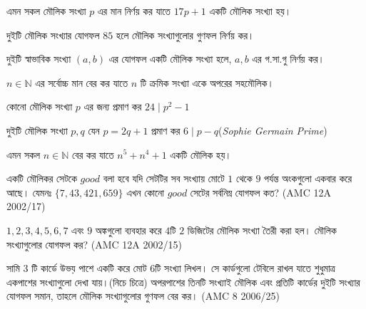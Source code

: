 \documentclass[a4paper,11pt]{article}
\begin{document}
\begin{Exercise}
	\label{xr-3}
	\begin{prob}
		এমন সকল মৌলিক সংখ্যা $p$ এর মান নির্ণয় কর যাতে $17p+1$ একটি মৌলিক সংখ্যা হয়। 
	\end{prob}
	\begin{prob}
		\label{sump}
		দুইটি মৌলিক সংখ্যার যোগফল $85$ হলে মৌলিক সংখ্যাগুলোর গুণফল নির্ণয় কর। 
	\end{prob}
	\begin{prob}
		দুইটি স্বাভাবিক সংখ্যা $(a,b)$ এর যোগফল একটি মৌলিক সংখ্যা হলে, $a,b$ এর গ.সা.গু নির্ণয় কর। 
	\end{prob}
	\begin{prob}
		$n \in \mathbb{N}$ এর সর্বোচ্চ মান বের কর যাতে $n$ টি ক্রমিক সংখ্যা একে অপরের সহমৌলিক। 
	\end{prob}
	\begin{prob}
		\label{Prime6}
		কোনো মৌলিক সংখ্যা $p$ এর জন্য প্রমাণ কর $24 \mid p^2-1$
	\end{prob}
	\begin{prob}
		দুইটি মৌলিক সংখ্যা $p,q$ যেন $p=2q+1$ প্রমাণ কর $6 \mid p-q$(\emph{Sophie Germain Prime})
	\end{prob}
	\begin{prob}
		এমন সকল $n\in \mathbb{N}$ বের কর যাতে $n^5+n^4+1$ একটি মৌলিক হয়।  
	\end{prob}
	\begin{prob}
		একটি মৌলিকর সেটকে $good$ বলা হবে যদি সেটটির সব সংখ্যায় মোটে  $1$ থেকে $9$ পর্যন্ত অংকগুলো একবার করে আছে। যেমনঃ $\{ 7,43,421,659 \}$ এখন কোনো $good$ সেটের সর্বনিম্ন যোগফল কত? (AMC 12A 2002/17)
	\end{prob}
	\begin{prob}
		$1,2,3,4,5,6,7$ এবং $9$ অঙ্কগুলো ব্যবহার করে $4$টি $2$ ডিজিটের মৌলিক সংখ্যা তৈরী করা হল। মৌলিক সংখ্যাগুলোর যোগফল কর? (AMC 12A 2002/15)
	\end{prob}
	\begin{prob}
		সামি $3$ টি কার্ডে উভয় পাশে একটি করে মোট $6$টি সংখ্যা লিখল। সে কার্ডগুলো টেবিলে রাখল যাতে শুধুমাত্র একপাশের সংখ্যাগুলো দেখা যায়।(নিচে চিত্রে) অপরপাশের তিনটি সংখ্যাই মৌলিক এবং প্রতিটি কার্ডের দুইটি সংখ্যার যোগফল সমান, তাহলে মৌলিক সংখ্যাগুলোর গুণফল বের কর। (AMC 8 2006/25)
		\begin{center}
\end{center}
\end{prob}
\end{Exercise}
\end{document}
